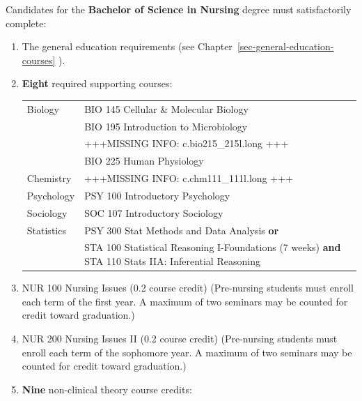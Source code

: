 \documentclass[
  letterpaper,
]{scrbook}
\renewcommand\toprule[2]\relax
\renewcommand\bottomrule[2]\relax
\begin{document}
Candidates for the \textbf{Bachelor of Science in Nursing} degree must
satisfactorily complete:

\begin{enumerate}
\def\labelenumi{\arabic{enumi}.}
\item
  The general education requirements (see
  Chapter~\ref{sec-general-education-courses} ).
\item
  \textbf{Eight} required supporting courses:

  \begin{longtable}[]{@{}
    >{\raggedright\arraybackslash}p{}
    >{\raggedleft\arraybackslash}p{}@{}}
  \toprule\noalign{}
  \endhead
  \bottomrule\noalign{}
  \endlastfoot
  Biology & BIO 145 Cellular \& Molecular Biology \\
  ~ & BIO 195 Introduction to Microbiology \\
  ~ & +++MISSING INFO: c.bio215\_215l.long +++ \\
  ~ & BIO 225 Human Physiology \\
  Chemistry & +++MISSING INFO: c.chm111\_111l.long +++ \\
  Psychology & PSY 100 Introductory Psychology \\
  Sociology & SOC 107 Introductory Sociology \\
  Statistics & PSY 300 Stat Methods and Data Analysis \textbf{or} \\
  ~ & STA 100 Statistical Reasoning I-Foundations (7 weeks) \textbf{and}
  STA 110 Stats IIA: Inferential Reasoning \\
  \end{longtable}
\item
  NUR 100 Nursing Issues (0.2 course credit) (Pre-nursing students must
  enroll each term of the first year. A maximum of two seminars may be
  counted for credit toward graduation.)
\item
  NUR 200 Nursing Issues II (0.2 course credit) (Pre-nursing students
  must enroll each term of the sophomore year. A maximum of two seminars
  may be counted for credit toward graduation.)
\item
  \textbf{Nine} non-clinical theory course credits:


\end{enumerate}
\end{document}
